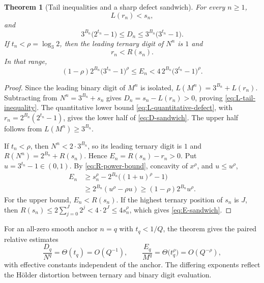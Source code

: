 \documentclass[11pt]{article}
\newtheorem{theorem}{Theorem}[section]
\theoremstyle{definition}
\theoremstyle{remark}
\begin{document}
\begin{theorem}[Tail inequalities and a sharp defect sandwich]
\label{thm:tail-defect-sandwich}
For every $n\ge1$,
\begin{equation}\label{eq:L-tail-inequality}
 L(r_n)<s_n,
\end{equation}
and
\begin{equation}\label{eq:D-sandwich}
 3^{B_n}\bigl(2^{t_n}-1\bigr)
 \le D_n
 \le3^{B_n}\bigl(3^{t_n}-1\bigr).
\end{equation}
If $t_n<\rho=\log_3 2$, then the leading ternary digit of $N^n$ is $1$ and
\begin{equation}\label{eq:R-tail-inequality}
 r_n<R(s_n).
\end{equation}
In that range,
\begin{equation}\label{eq:E-sandwich}
 (1-\rho)2^{B_n}\bigl(3^{t_n}-1\bigr)^\rho
 \le E_n
 <4\,2^{B_n}\bigl(3^{t_n}-1\bigr)^\rho.
\end{equation}
\end{theorem}

\begin{proof}
Since the leading binary digit of $M^n$ is isolated,
$L(M^n)=3^{B_n}+L(r_n)$.  Subtracting from
$N^n=3^{B_n}+s_n$ gives $D_n=s_n-L(r_n)>0$, proving
\eqref{eq:L-tail-inequality}.  The quantitative lower bound
\eqref{eq:L-quantitative-defect}, with
$r_n=2^{B_n}(2^{t_n}-1)$, gives the lower half of
\eqref{eq:D-sandwich}.  The upper half follows from
$L(M^n)\ge3^{B_n}$.

If $t_n<\rho$, then $N^n<2\cdot3^{B_n}$, so its leading ternary digit is $1$ and
$R(N^n)=2^{B_n}+R(s_n)$.  Hence
$E_n=R(s_n)-r_n>0$.  Put $u=3^{t_n}-1\in(0,1)$.  By
\eqref{eq:R-power-bound}, concavity of $x^\rho$, and $u\le u^\rho$,
\[
 \begin{split}
 E_n
 &\ge s_n^\rho-2^{B_n}\bigl((1+u)^\rho-1\bigr)\\
 &\ge2^{B_n}(u^\rho-\rho u)
 \ge(1-\rho)2^{B_n}u^\rho.
 \end{split}
\]
For the upper bound, $E_n<R(s_n)$.  If the highest ternary position of $s_n$ is
$J$, then
$R(s_n)\le2\sum_{j=0}^{J}2^j<4\cdot2^J\le4s_n^\rho$, which gives
\eqref{eq:E-sandwich}.
\end{proof}

For an all-zero smooth anchor $n=q$ with $t_q<1/Q$, the theorem gives the paired
relative estimates
\begin{equation}\label{eq:defect-smallness}
 \frac{D_q}{N^q}=\Theta(t_q)=O(Q^{-1}),
 \qquad
 \frac{E_q}{M^q}=\Theta\bigl(t_q^\rho\bigr)=O(Q^{-\rho}),
\end{equation}
with effective constants independent of the anchor.  The differing exponents reflect
the H\"older distortion between ternary and binary digit evaluation.
\end{document}
